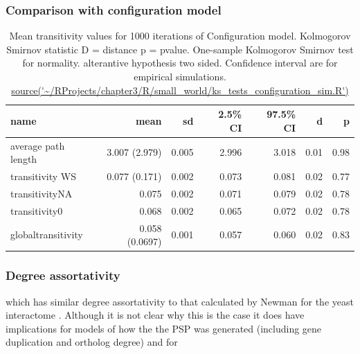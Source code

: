 \subsubsection{Comparison with configuration model}
\begin{table}[ht]
\centering
\begin{tabular}{lrrrrrr}
  \hline
name & mean & sd & 2.5\% CI & 97.5\% CI & d & p \\ 
  \hline
average path length & 3.007 (2.979) & 0.005 & 2.996 & 3.018 & 0.01 & 0.98 \\ 
  transitivity WS & 0.077 (0.171) & 0.002 & 0.073 & 0.081 & 0.02 & 0.77 \\ 
  transitivityNA & 0.075 & 0.002 & 0.071 & 0.079 & 0.02 & 0.78 \\ 
  transitivity0 & 0.068 & 0.002 & 0.065 & 0.072 & 0.02 & 0.78 \\ 
  globaltransitivity & 0.058 (0.0697) & 0.001 & 0.057 & 0.060 & 0.02 & 0.83 \\ 
   \hline
\end{tabular}
\caption{Mean transitivity values for 1000 iterations of Configuration  model. Kolmogorov Smirnov statistic D = distance p = pvalue. One-sample Kolmogorov Smirnov test for normality. alterantive hypothesis two sided. Confidence interval are for empirical simulations. \url{source('~/RProjects/chapter3/R/small_world/ks_tests_configuration_sim.R')} } 
\label{tab:Mean transitivity values for 1000 iterations of Configuration model.}
\end{table}




\subsubsection{Degree assortativity}
which has similar degree assortativity to that calculated by Newman for the yeast interactome \cite{jeong2001lethality}.
 Although it is not clear why this is the case it does have implications for models of how the the PSP was generated (including gene duplication and ortholog degree) and for 


